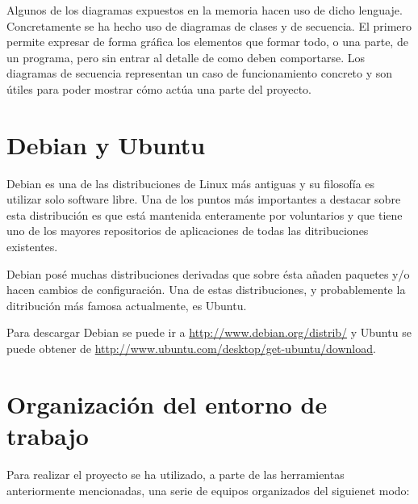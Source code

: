 Algunos de los diagramas expuestos en la memoria hacen uso de dicho lenguaje. Concretamente se ha hecho uso de diagramas de clases y de secuencia. El primero permite expresar de forma gráfica los elementos que formar todo, o una parte, de un programa, pero sin entrar al detalle de como deben comportarse. Los diagramas de secuencia representan un caso de funcionamiento concreto y son útiles para poder mostrar cómo actúa una parte del proyecto.

\section{Debian y Ubuntu}

Debian es una de las distribuciones de Linux más antiguas y su filosofía es utilizar solo software libre. Una de los puntos más importantes a destacar sobre esta distribución es que está mantenida enteramente por voluntarios y que tiene uno de los mayores repositorios de aplicaciones de todas las ditribuciones existentes.

Debian posé muchas distribuciones derivadas que sobre ésta añaden paquetes y/o hacen cambios de configuración. Una de estas distribuciones, y probablemente la ditribución más famosa actualmente, es Ubuntu.

Para descargar Debian se puede ir a \url{http://www.debian.org/distrib/} y Ubuntu se puede obtener de \url{http://www.ubuntu.com/desktop/get-ubuntu/download}.

\section{Organización del entorno de trabajo}

Para realizar el proyecto se ha utilizado, a parte de las herramientas anteriormente mencionadas, una serie de equipos organizados del siguienet modo:

